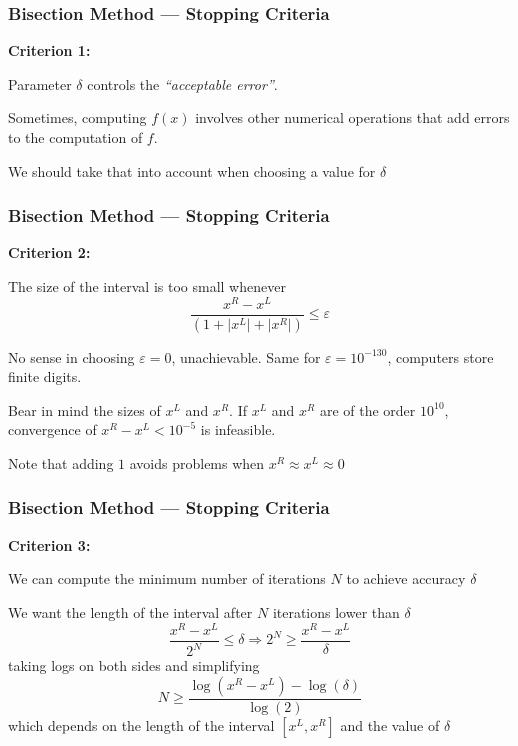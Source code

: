 \documentclass[11pt,xcolor={svgnames},aspectratio=169,usepdftitle=false]{beamer}
\let\toneitemize\itemize
\let\ttwoitemize\enditemize
\renewenvironment{itemize}{\toneitemize\addtolength{\itemsep}{0.7\baselineskip}}{\ttwoitemize}
\begin{document}
\begin{frame}
  \frametitle{Bisection Method --- Stopping Criteria}
\alert{\textbf{Criterion 1:}}
\begin{itemize}
  \item Parameter $\delta$ controls the \textit{``acceptable error''}.
  \item Sometimes, computing $f(x)$ involves other numerical operations that add errors to the computation of $f$.
  \item We should take that into account when choosing a value for $\delta$
\end{itemize}
\end{frame}


\begin{frame}
  \frametitle{Bisection Method --- Stopping Criteria}
\alert{\textbf{Criterion 2:}}
\begin{itemize}
  \item The size of the interval is too small whenever
  \[
  \frac{x^R - x^L}{(1 + \lvert x^L \rvert + \lvert x^R \rvert)} \leq \varepsilon
  \]
  \item No sense in choosing $\varepsilon = 0$, unachievable. Same for $\varepsilon = 10^{-130}$, computers store finite digits.
  \item Bear in mind the sizes of $x^L$ and $x^R$. {\tiny If $x^L$ and $x^R$ are of the order $10^{10}$, convergence of $x^R-x^L < 10^{-5}$ is infeasible.}
  \item Note that adding $1$ avoids problems when $x^R\approx x^L \approx 0$
\end{itemize}
\end{frame}

\begin{frame}
  \frametitle{Bisection Method --- Stopping Criteria}
\alert{\textbf{Criterion 3:}}
\begin{itemize}
  \item We can compute the minimum number of iterations $N$ to achieve accuracy $\delta$
  \item We want the length of the interval after $N$ iterations lower than $\delta$
  \[
  \frac{x^R - x^L}{2^N} \leq \delta \Rightarrow 2^N \geq \frac{x^R - x^L}{\delta}
  \]
  taking logs on both sides and simplifying
  \[
  N\geq \frac{\log(x^R - x^L) - \log(\delta)}{\log(2)}  
  \]
  which depends on the length of the interval $[x^L, x^R]$ and the value of $\delta$
\end{itemize}
\end{frame}
\end{document}
